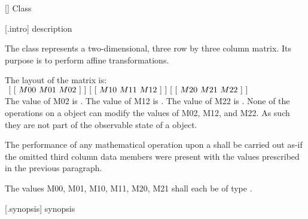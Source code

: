  [\matrixtwod] {Class }

 [\matrixtwod.intro] { description}

\pnum
The  class represents a two-dimensional, three row by three column matrix. Its purpose is to perform affine transformations.

\pnum
\pnum
The layout of the matrix is: \\
$
~[~[~M00~M01~M02~]~] \\
~[~[~M10~M11~M12~]~] \\
~[~[~M20~M21~M22~]~]$ \\

The value of M02 is . The value of M12 is . The value of M22 is . None of the operations on a  object can modify the values of M02, M12, and M22. As such they are not part of the observable state of a  object.

\pnum
The performance of any mathematical operation upon a  shall be carried out as-if the omitted third column data members were present with the values prescribed in the previous paragraph.

\pnum
The values M00, M01, M10, M11, M20, M21 shall each be of type .

 [\matrixtwod.synopsis] { synopsis}

